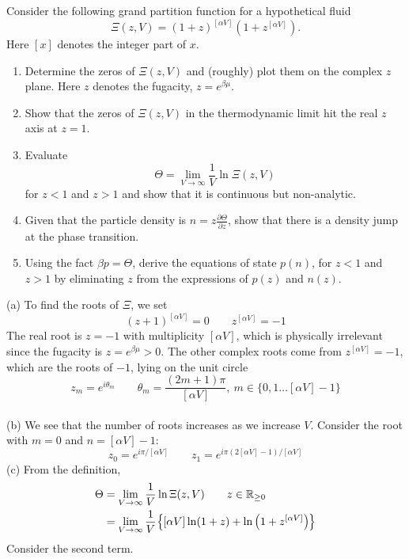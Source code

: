 \begin{question}

 Consider the following grand partition function for a hypothetical fluid
\[
\Xi(z,V) = (1+z)^{[\alpha V]}(1+z^{[\alpha V]}).
\]
Here $[x]$ denotes the integer part of $x$.

\begin{enumerate}
\item[(a)] Determine the zeros of $\Xi(z,V)$ and (roughly) plot them on the complex $z$ plane. Here $z$ denotes the fugacity, $z=e^{\beta\mu}$.

\item[(b)] Show that the zeros of $\Xi(z,V)$ in the thermodynamic limit hit the real $z$ axis at $z=1$.

\item[(c)] Evaluate
\[
\Theta = \lim_{V\to\infty} \frac{1}{V}\ln\Xi(z,V)
\]
for $z<1$ and $z>1$ and show that it is continuous but non-analytic.

\item[(d)] Given that the particle density is $n = z\frac{\partial \Theta}{\partial z}$, show that there is a density jump at the phase transition.

\item[(e)] Using the fact $\beta p = \Theta$, derive the equations of state $p(n)$, for $z<1$ and $z>1$ by eliminating $z$ from the expressions of $p(z)$ and $n(z)$.
\end{enumerate}
\end{question}
(a) To find the roots of $\Xi$, we set 
\begin{equation}
    (z+1)^{[\alpha V]} = 0 \qquad z^{[\alpha V]} = -1
\end{equation} 
The real root is $z=-1$ with multiplicity $[\alpha V]$,  which is physically irrelevant since the fugacity is $z=e^{\beta \mu} > 0$. The other complex roots come from $z^{[\alpha V] } = -1$, which are the roots of $-1$, lying on the unit circle 
$$z_m = e^{i\theta_m}\qquad \theta_m = \frac{(2m+1)\pi}{[\alpha V]}, \ m \in \{0,1\ldots [\alpha V]-1\}$$ \\[0.2cm]
(b) We see that the number of roots increases as we increase $V$. Consider the root with $m=0$ and $n=[\alpha V]-1$:
$$z_0 = e^{i\pi/[\alpha V]} \qquad z_1 = e^{i\pi(2[\alpha V]-1)/[\alpha V] }$$
(c) From the definition, 
\begin{align}
  \begin{split}
      \Theta &= \lim\limits_{V\to \infty} \frac{1}{V} \ln \Xi(z,V) \qquad z \in \mathbb{R}_{\geq 0} \\
&= \lim\limits_{V\to \infty} \frac{1}{V} \qty{[\alpha V]\ln (1+z) + \ln\qty(1 + z^{[\alpha V]})}
  \end{split}
\end{align}
Consider the second term. 
